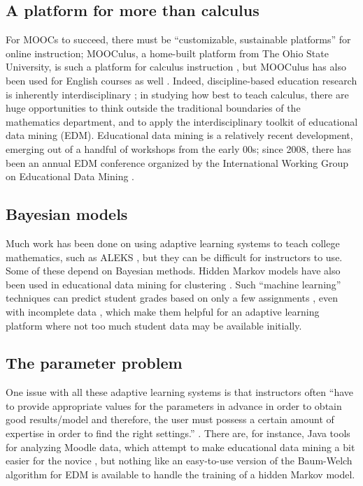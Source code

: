 \documentclass[12pt]{article}
\begin{document}
\subsection{A platform for more than calculus}

For MOOCs to succeed, there must be ``customizable, sustainable
platforms'' \parencite{bowen2013higher} for online instruction;
MOOCulus, a home-built platform from The Ohio State University, is
such a platform for calculus instruction \parencite{evans}, but
MOOCulus has also been used for English courses as
well \parencite{gates-foundation-grant}.  Indeed, discipline-based
education research is inherently interdisciplinary \cite{dber-report};
in studying how best to teach calculus, there are huge opportunities
to think outside the traditional boundaries of the mathematics
department, and to apply the interdisciplinary toolkit of educational
data mining (EDM).  Educational data mining is a relatively recent
development, emerging out of a handful of workshops from the early
00s; since 2008, there has been an annual EDM conference organized by
the International Working Group on Educational Data
Mining \parencite{WIDM:WIDM1075}.

\subsection{Bayesian models}

Much work has been done on using adaptive learning systems to teach
college mathematics, such as ALEKS \parencite{hagerty2005using}, but
they can be difficult for instructors to use.  Some of these depend on
Bayesian methods.  Hidden Markov models have also been used in
educational data mining for clustering
\parencite{shihdiscovery}.  Such ``machine learning'' techniques can
predict student grades based on only a few
assignments \parencite{predict-grades}, even with incomplete
data \parencite{Zafra201115020}, which make them helpful for an
adaptive learning platform where not too much student data may be
available initially.

\subsection{The parameter problem}

One issue with all these adaptive learning systems is that instructors
often ``have to provide appropriate values for the parameters in
advance in order to obtain good results/model and therefore, the user
must possess a certain amount of expertise in order to find the right
settings.'' \parencite{romero2010educational}.  There are, for
instance, Java tools for analyzing Moodle data, which attempt to make
educational data mining a bit easier for the
novice \parencite{java-data-mining}, but nothing like an easy-to-use
version of the Baum-Welch algorithm for EDM is available to handle the
training of a hidden Markov model.
\end{document}
